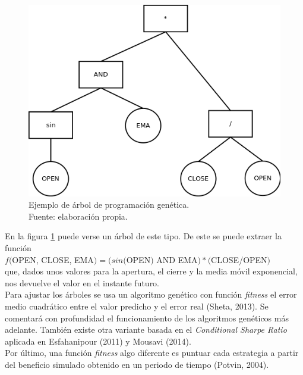 	\begin{figure}[H]
		\centering
    	\includegraphics[scale=0.5]{imagenes/arbol_inf_comp.png}
    	\caption[Ejemplo de \'arbol de programaci\'on gen\'etica]{Ejemplo de \'arbol de programaci\'on gen\'etica.\\ Fuente: elaboraci\'on propia.}
    	\label{fig:inf_compl}
    \end{figure}
    
    En la figura \ref{fig:inf_compl} puede verse un \'arbol de este tipo. De este se puede extraer la funci\'on \\
    $f($OPEN, CLOSE, EMA$) = (sin($OPEN$)$ AND EMA$) * ($CLOSE/OPEN$)$\\ que, dados unos valores para la apertura, el cierre y la media m\'ovil exponencial, nos devuelve el valor en el instante futuro.\\
    
    Para ajustar los \'arboles se usa un algoritmo gen\'etico con funci\'on \textit{fitness} el error medio cuadr\'atico entre el valor predicho y el error real (Sheta, 2013). Se comentar\'a con profundidad el funcionamiento de los algoritmos gen\'eticos m\'as adelante. Tambi\'en existe otra variante basada en el \textit{Conditional Sharpe Ratio} aplicada en Esfahanipour (2011) y Mousavi (2014).\\
    
    Por \'ultimo, una funci\'on \textit{fitness} algo diferente es puntuar cada estrategia a partir del beneficio simulado obtenido en un periodo de tiempo (Potvin, 2004).\\
    
